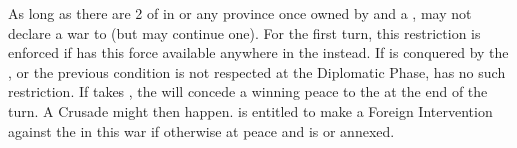 \begin{digressions}


  \aparag As long as there are 2 \ARMY\faceplus of \HAB in \villeVienne or any
  province once owned by \paysHongrie and a \LeaderG, \TUR may not declare a
  war to \HAB (but may continue one). For the first turn, this restriction is
  enforced if \HAB has this force available anywhere in the \HRE instead.
  \aparag If \villeVienne is conquered by the \alliance, or the previous
  condition is not respected at the Diplomatic Phase, \TUR has no such
  restriction.
  \aparag If \TUR takes \villeVienne, the \ligue will concede a winning peace
  to the \alliance at the end of the turn. A Crusade might then happen.
  \aparag \TUR is entitled to make a Foreign Intervention against the \ligue
  in this war if otherwise at peace and \paysTransylvanie is \VASSAL or
  annexed.




\end{digressions}
